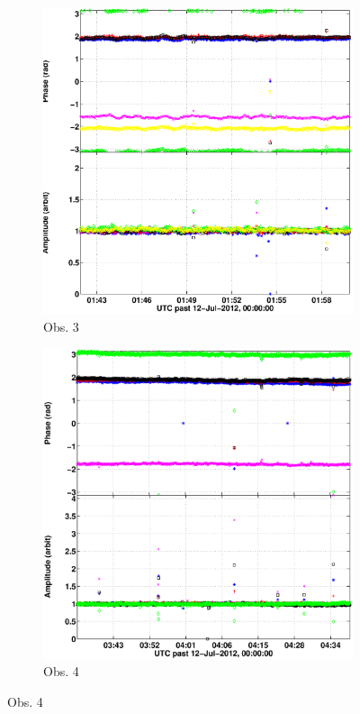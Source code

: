 \documentclass{aa}
\begin{document}
\begin{figure}[tbh]

\begin{subfigure}[b]{\columnwidth}
\includegraphics[width=1\columnwidth]{Figs/SB002_LBA_OUTER_SPREAD_1ch_8_convcalsol_bin_gains.eps}
\caption{Obs. 3}
\end{subfigure}

\begin{subfigure}[b]{\columnwidth}
\includegraphics[width=1\columnwidth]{Figs/combined_SB002_2_convcalsol_bin_gains.eps}
\caption{Obs. 4}
\end{subfigure}


\end{figure}
\end{document}
